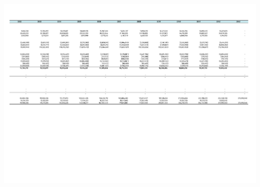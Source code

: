 \begin{landscape}
\begin{table}
\includegraphics[clip, trim=0cm 5cm 0cm 0cm, width=\linewidth]{chapters/Z-support/attachments/Cash2.pdf}
\end{table}

\end{landscape}

